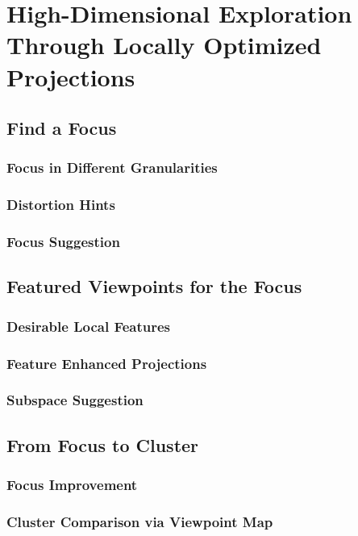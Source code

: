 \section{High-Dimensional Exploration Through Locally Optimized Projections}
\subsection{Find a Focus}
\subsubsection{Focus in Different Granularities}
\subsubsection{Distortion Hints}
\subsubsection{Focus Suggestion}
\subsection{Featured Viewpoints for the Focus}
\subsubsection{Desirable Local Features}
\subsubsection{Feature Enhanced Projections}
\subsubsection{Subspace Suggestion}
\subsection{From Focus to Cluster}
\subsubsection{Focus Improvement}
\subsubsection{Cluster Comparison via Viewpoint Map}
